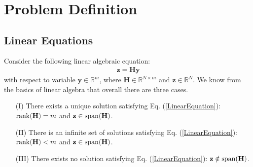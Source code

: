 \documentclass[a4paper, 11pt]{article}
\begin{document}
\section{Problem Definition}\label{Sec:Problem}

\subsection{Linear Equations}
Consider the following  linear algebraic equation:
\begin{align}\label{LinearEquation}
\mathbf{z}=\mathbf{H} \mathbf{y}
\end{align}
with respect to variable $\mathbf{y}\in\mathbb{R}^m$, where $\mathbf{H}\in\mathbb{R}^{N\times m}$ and $\mathbf{z}\in\mathbb{R}^N$. We know from the basics of linear algebra that overall there are three cases.

\begin{itemize}
\item[(I)] There exists a unique solution satisfying  Eq. (\ref{LinearEquation}): ${\rm rank}(\mathbf{H})=m$ and $\mathbf{z}\in {\rm span}(\mathbf{H})$.

\item[(II)] There is an infinite set of  solutions  satisfying  Eq. (\ref{LinearEquation}): ${\rm rank}(\mathbf{H})<m$ and $\mathbf{z}\in {\rm span}(\mathbf{H})$.


\item[(III)] There exists no solution   satisfying  Eq. (\ref{LinearEquation}): $\mathbf{z}\notin {\rm span}(\mathbf{H})$.
\end{itemize}
\end{document}
